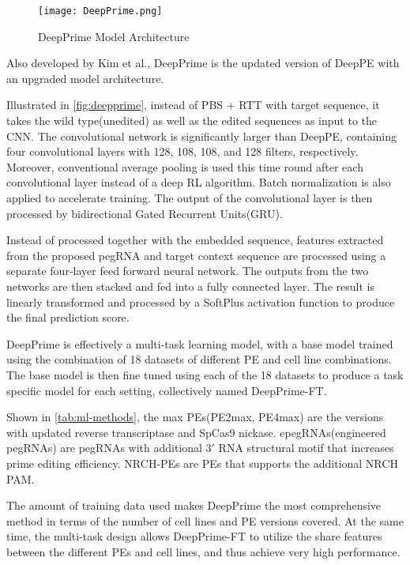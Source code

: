 \begin{figure}[ht]
    \centering
    \texttt{[image: DeepPrime.png]}
    \caption{DeepPrime Model Architecture}
    \label{fig:deepprime}
\end{figure}


Also developed by Kim et al., DeepPrime is the updated version of DeepPE with an upgraded model architecture. 

Illustrated in \autoref{fig:deepprime}, instead of PBS + RTT with target sequence, it takes the wild type(unedited) as well as the edited sequences as input to the CNN. The convolutional network is significantly larger than DeepPE, containing four convolutional layers with 128, 108, 108, and 128 filters, respectively. Moreover, conventional average pooling is used this time round after each convolutional layer instead of a deep RL algorithm. Batch normalization is also applied to accelerate training.  The output of the convolutional layer is then processed by bidirectional Gated Recurrent Units(GRU). 

Instead of processed together with the embedded sequence, features extracted from the proposed pegRNA and target context sequence are processed using a separate four-layer feed forward neural network. The outputs from the two networks are then stacked and fed into a fully connected layer. The result is linearly transformed and processed by a SoftPlus activation function to produce the final prediction score.


DeepPrime is effectively a multi-task learning model, with a base model trained using the combination of 18 datasets of different PE and cell line combinations. The base model is then fine tuned using each of the 18 datasets to produce a task specific model for each setting, collectively named DeepPrime-FT.  

Shown in \autoref{tab:ml-methods}, the max PEs(PE2max, PE4max) are the versions with updated reverse transcriptase and SpCas9 nickase. epegRNAs(engineered pegRNAs) are pegRNAs with additional $3'$ RNA structural motif that increases prime editing efficiency\cite{chenEnhancedPrimeEditing2021}. NRCH-PEs are PEs that supports the additional NRCH PAM.

The amount of training data used makes DeepPrime the most comprehensive method in terms of the number of cell lines and PE versions covered. At the same time, the multi-task design allows DeepPrime-FT to utilize the share features between the different PEs and cell lines, and thus achieve very high performance. 

